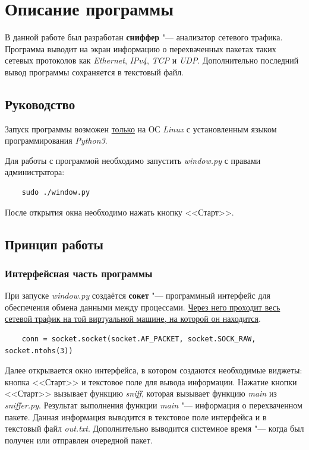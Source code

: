 \documentclass[bachelor, och, coursework]{SCWorks}
\begin{document}
\section{Описание программы}
В данной работе был разработан \textbf{сниффер} "--- анализатор сетевого трафика. Программа выводит на экран информацию о перехваченных пакетах таких сетевых протоколов как \textit{Ethernet}, \textit{IPv4}, \textit{TCP} и \textit{UDP}. Дополнительно последний вывод программы сохраняется в текстовый файл.

\subsection{Руководство}
Запуск программы возможен \underline{только} на ОС \textit{Linux} с установленным языком программирования \textit{Python3}.

Для работы с программой необходимо запустить \textit{window.py} с правами администратора:
\begin{verbatim}
    sudo ./window.py
\end{verbatim}
После открытия окна необходимо нажать кнопку <<Старт>>.

\subsection{Принцип работы}
\subsubsection{Интерфейсная часть программы}
При запуске \textit{window.py} создаётся \textbf{сокет} "--- программный интерфейс для обеспечения обмена данными между процессами. \underline{Через него проходит весь} \\ \underline{сетевой трафик на той виртуальной машине, на которой он находится}. %

\begin{verbatim}
    conn = socket.socket(socket.AF_PACKET, socket.SOCK_RAW, socket.ntohs(3))
\end{verbatim}

Далее открывается окно интерфейса, в котором создаются необходимые виджеты: кнопка <<Старт>> и текстовое поле для вывода информации. Нажатие кнопки <<Старт>> вызывает функцию \textit{sniff}, которая вызывает функцию \textit{main} из \textit{sniffer.py}. Результат выполнения функции \textit{main} "--- информация о перехваченном пакете. Данная информация выводится в текстовое поле интерфейса и в текстовый файл \textit{out.txt}. Дополнительно выводится системное время "--- когда был получен или отправлен очередной пакет. 
\end{document}
